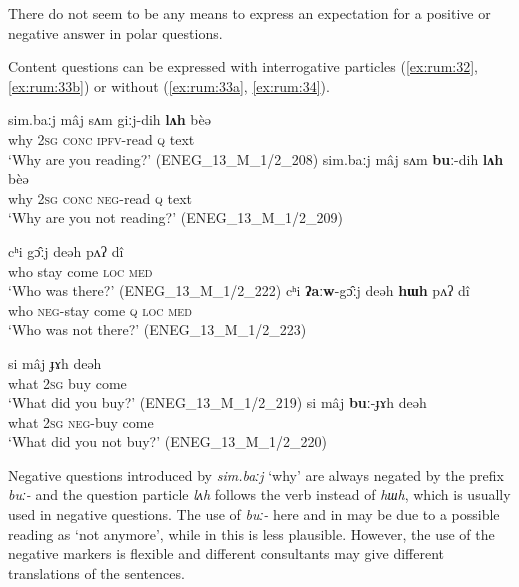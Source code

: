 \documentclass[output=paper,colorlinks,citecolor=brown]{langscibook}
\begin{document}
There do not seem to be any means to express an expectation for a positive or negative answer in polar questions.

Content questions can be expressed with interrogative particles (\ref{ex:rum:32}, \ref{ex:rum:33b}) or without (\ref{ex:rum:33a}, \ref{ex:rum:34}).

\ea\label{ex:rum:32}
    \ea\label{ex:rum:32a}
        \gll sim.baːj	mâj	sʌm	giːj-dih	\textbf{lʌh}	bèə \\ 
             why 2\textsc{sg} \textsc{conc} \textsc{ipfv}{}-read \textsc{q} text \\
        \glt ‘Why are you reading?’ (ENEG\_13\_M\_1/2\_208)
    \ex\label{ex:rum:32b}
        \gll sim.baːj	mâj	sʌm	\textbf{buː}-dih	\textbf{lʌh}	bèə \\
             why 2\textsc{sg} \textsc{conc} \textsc{neg}{}-read \textsc{q} text \\
        \glt ‘Why are you not reading?’ (ENEG\_13\_M\_1/2\_209)
    \z
\z 

\ea\label{ex:rum:33}
    \ea\label{ex:rum:33a}
        \gll cʰi	gɔ̂ːj	deəh	pʌʔ	dî \\ 
             who stay come \textsc{loc} \textsc{med} \\
        \glt ‘Who was there?’ (ENEG\_13\_M\_1/2\_222)
    \ex\label{ex:rum:33b}
        \gll cʰi	\textbf{ʔaːw}-gɔ̂ːj	deəh	\textbf{hɯh}	pʌʔ	dî \\
             who \textsc{neg}{}-stay come \textsc{q} \textsc{loc} \textsc{med} \\
        \glt ‘Who was not there?’ (ENEG\_13\_M\_1/2\_223)
    \z
\z 

\ea\label{ex:rum:34}
    \ea\label{ex:rum:34a}
        \gll si	mâj	ɟɤh	deəh \\ 
             what 2\textsc{sg} buy come \\
        \glt ‘What did you buy?’ (ENEG\_13\_M\_1/2\_219)
    \ex\label{ex:rum:34b}
        \gll si	mâj	\textbf{buː}-ɟɤh	deəh \\
             what 2\textsc{sg} \textsc{neg}{}-buy come \\
        \glt ‘What did you not buy?’ (ENEG\_13\_M\_1/2\_220)
    \z
\z  

Negative questions introduced by \textit{sim.baːj} ‘why’  are always negated by the prefix \textit{buː{}-} and the question particle \textit{lʌh} follows the verb instead of \textit{hɯh}, which is usually used in negative questions. The use of \textit{buː-} here and in  may be due to a possible reading as ‘not anymore’, while in  this is less plausible. However, the use of the negative markers is flexible and different consultants may give different translations of the sentences.
\end{document}
